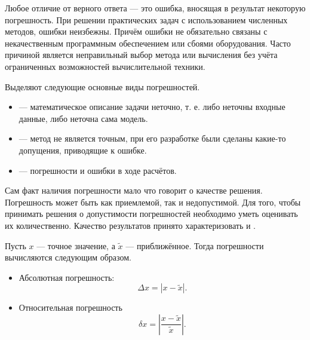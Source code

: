 

\Theory


Любое отличие от верного ответа — это ошибка, вносящая в результат
некоторую погрешность. При решении практических задач с использованием
численных методов, ошибки неизбежны. Причём ошибки не обязательно
связаны с некачественным программным обеспечением или сбоями
оборудования.  Часто причиной является неправильный выбор метода или
вычисления без учёта ограниченных возможностей вычислительной техники.

Выделяют следующие основные виды погрешностей.

\begin{itemize}
\item{} —
  математическое описание задачи неточно, т. е. либо неточны входные
  данные, либо неточна сама модель.
\item{} — метод не является
  точным, при его разработке были сделаны какие-то допущения,
  приводящие к ошибке.
\item{} —
  погрешности и ошибки в ходе расчётов.
\end{itemize}


Сам факт наличия погрешности мало что говорит о качестве решения.
Погрешность может быть как приемлемой, так и недопустимой. Для того,
чтобы принимать решения о допустимости погрешностей необходимо уметь
оценивать их количественно. Качество результатов принято
характеризовать  и
.

Пусть $x$ — точное значение, а $\tilde{x}$ — приближённое. Тогда
погрешности вычисляются следующим образом.
\begin{itemize}
\item Абсолютная погрешность:
  \[
  \boxed{\Delta x = \left|x-\tilde{x}\right|.}
  \]
\item Относительная погрешность
  \[
  \boxed{\delta x = \left|\frac{x-\tilde{x}}{\tilde{x}}\right|.}
  \]
\end{itemize}

